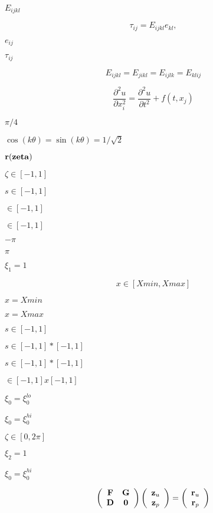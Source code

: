 \documentclass{article}
\begin{document}
$E_{ijkl}$
\pagebreak

\[\tau_{ij} = E_{ijkl} e_{kl},\]
\pagebreak

$e_{ij}$
\pagebreak

$\tau_{ij}$
\pagebreak

\[E_{ijkl} = E_{jikl} = E_{ijlk} = E_{klij}\]
\pagebreak

\[ \frac{\partial^2 u}{\partial x_i^2}= \frac{\partial^2 u}{\partial t^2}+f(t,x_j) \]
\pagebreak

$ \pi/4 $
\pagebreak

$ \cos(k \theta) = \sin(k \theta) = 1/\sqrt{2} $
\pagebreak

$ {\bf r}({\bf zeta}) $
\pagebreak

$ \zeta \in [-1,1] $
\pagebreak

$ s \in [-1,1] $
\pagebreak

$ \in [-1,1] $
\pagebreak

$\in [-1,1] $
\pagebreak

$-\pi$
\pagebreak

$\pi$
\pagebreak

$\xi_1 = 1$
\pagebreak

\[ x \in [Xmin,Xmax] \]
\pagebreak

$x=Xmin$
\pagebreak

$x=Xmax$
\pagebreak

$s \in [-1,1] $
\pagebreak

$ s \in [-1,1]*[-1,1] $
\pagebreak

$s \in [-1,1]*[-1,1] $
\pagebreak

$ \in [-1,1]x[-1,1] $
\pagebreak

$ \xi_0 = \xi_0^{lo} $
\pagebreak

$ \xi_0 = \xi_0^{hi} $
\pagebreak

$\zeta \in [0,2\pi]$
\pagebreak

$\xi_2 = 1$
\pagebreak

$\xi_0 = \xi_0^{hi}$
\pagebreak

\[ \left( \begin{array}{cc} {\bf F} & {\bf G} \\ {\bf D} & {\bf 0} \end{array} \right) \left( \begin{array}{c} {\bf z}_u \\ {\bf z}_p \end{array} \right) = \left( \begin{array}{c} {\bf r}_u \\ {\bf r}_p \end{array} \right) \]
\pagebreak
\end{document}
